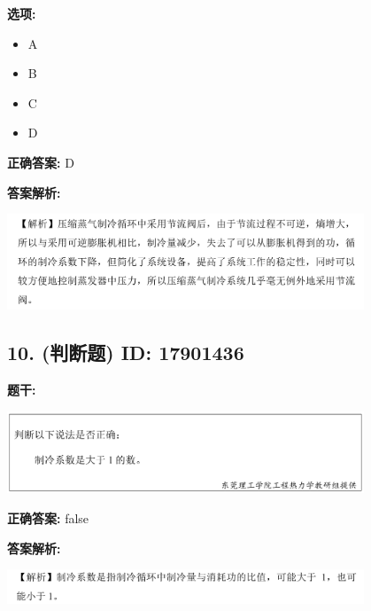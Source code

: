 \documentclass[12pt]{article}
\begin{document}
\textbf{选项:}
\begin{itemize}[leftmargin=*]
  \item A

  \item B

  \item C

  \item D

\end{itemize}

\textbf{正确答案:}
D

\textbf{答案解析:}


\begin{center}\includegraphics[width=0.8\textwidth, height=0.25\textheight, keepaspectratio]{question_9_17901441/correct_replay_img_1.png}\end{center}

\vspace{0.5em}\hrulefill\vspace{1em}

\subsection*{10. (判断题) \small ID: 17901436}

\textbf{题干:}


\begin{center}\includegraphics[width=0.8\textwidth, height=0.25\textheight, keepaspectratio]{question_10_17901436/title_img_1.png}\end{center}

\textbf{正确答案:}
false

\textbf{答案解析:}


\begin{center}\includegraphics[width=0.8\textwidth, height=0.25\textheight, keepaspectratio]{question_10_17901436/correct_replay_img_1.png}\end{center}
\end{document}
